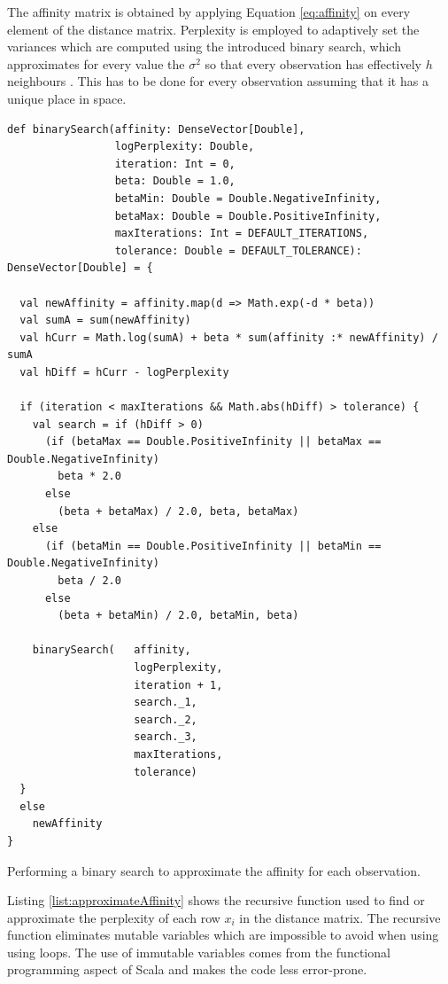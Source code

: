 The affinity matrix is obtained by applying Equation \ref{eq:affinity} on every element of the distance matrix. Perplexity is employed to adaptively set the variances which are computed using the introduced binary search, which approximates for every value the $\sigma^{2}$ so that every observation has effectively $h$ neighbours \cite{NIPS20022276}. This has to be done for every observation assuming that it has a unique place in space. 

\begin{listing}[ht!]
\begin{verbatim}
def binarySearch(affinity: DenseVector[Double],
                 logPerplexity: Double,
                 iteration: Int = 0,
                 beta: Double = 1.0,
                 betaMin: Double = Double.NegativeInfinity,
                 betaMax: Double = Double.PositiveInfinity,
                 maxIterations: Int = DEFAULT_ITERATIONS,
                 tolerance: Double = DEFAULT_TOLERANCE): DenseVector[Double] = {

  val newAffinity = affinity.map(d => Math.exp(-d * beta))
  val sumA = sum(newAffinity)
  val hCurr = Math.log(sumA) + beta * sum(affinity :* newAffinity) / sumA
  val hDiff = hCurr - logPerplexity

  if (iteration < maxIterations && Math.abs(hDiff) > tolerance) {
    val search = if (hDiff > 0)
      (if (betaMax == Double.PositiveInfinity || betaMax == Double.NegativeInfinity)
        beta * 2.0
      else
        (beta + betaMax) / 2.0, beta, betaMax)
    else
      (if (betaMin == Double.PositiveInfinity || betaMin == Double.NegativeInfinity)
        beta / 2.0
      else
        (beta + betaMin) / 2.0, betaMin, beta)

    binarySearch(   affinity,
                    logPerplexity, 
                    iteration + 1, 
                    search._1, 
                    search._2, 
                    search._3, 
                    maxIterations, 
                    tolerance)
  }
  else
    newAffinity
}
\end{verbatim}
\caption{Performing a binary search to approximate the affinity for each observation.}
\label{list:approximateAffinity}
\end{listing}

Listing \ref{list:approximateAffinity} shows the recursive function used to find or approximate the perplexity of each row $x_{i}$ in the distance matrix. The recursive function eliminates mutable variables which are impossible to avoid when using using loops. The use of immutable variables comes from the functional programming aspect of Scala and makes the code less error-prone.

